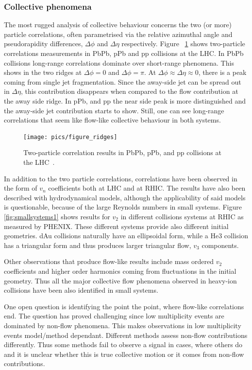 \subsubsection{Collective phenomena}
The most rugged analysis of collective behaviour concerns the two (or more) particle correlations, often parametrised via the relative azimuthal angle and pseudorapidity differences, $\Delta \phi$ and $\Delta \eta$ respectively. Figure ~\ref{fig:smallsystems2} shows two-particle correlations measurements in PbPb, pPb and pp collisions at the LHC. In PbPb collisions long-range correlations dominate over short-range phenomena. This shows in the two ridges at $\Delta \phi = 0 $ and $\Delta \phi = \pi$. At $\Delta\phi\approx\Delta\eta\approx0$, there is a peak coming from single jet fragmentation. Since the away-side jet can be spread out in $\Delta\eta$, this contribution disappears when compared to the flow contribution at the away side ridge. In pPb, and pp the near side peak is more distinguished and the away-side jet contribution starts to show. Still, one can see long-range correlations that seem like flow-like collective behaviour in both systems. 
\begin{figure}[b!]
\centering
            	\texttt{[image: pics/figure\_ridges]}
                \caption{Two-particle correlation results in PbPb, pPb, and pp collisions at the LHC~\cite{}. }
	\label{fig:smallsystems2}
\end{figure}

In addition to the two particle correlations, correlations have been observed in the form of $v_n$ coefficients both at LHC and at RHIC. The results have also been described  with hydrodynamical models, although the applicability of said models is questionable, because of the large Reynolds numbers in small systems. Figure \ref{fig:smallsystems1} shows results for $v_2$ in different collisions systems at RHIC as measured by PHENIX. These different systems provide also different initial geometries. dAu collisions naturally have an ellipsoidal form, while a He3 collision has a triangular form and thus produces larger triangular flow, $v_3$ components. 

Other observations that produce flow-like results include mass ordered $v_2$ coefficients and higher order harmonics coming from fluctuations in the initial geometry. Thus all the major collective flow phenomena observed in heavy-ion collisions have been also identified in small systems.

One open question is identifying the point the point, where flow-like correlations end. The question has proved challenging since low multiplicity events are dominated by non-flow phenomena. This makes observations in low multiplicity events model/method dependant. Different methods assess non-flow contributions differently. Thus some methods fail to observe a signal in cases, where others do and it is unclear whether this is true collective motion or it comes from non-flow contributions.

